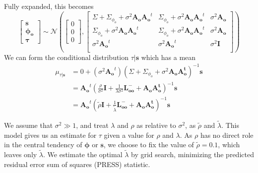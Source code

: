         \noindent Fully expanded, this becomes
        \begin{equation}
            \begin{bmatrix}
                \mathbf{s}\\
                \mathbf{\phi_o}\\
                \mathbf{\tau}
            \end{bmatrix} \sim \mathcal{N}\left(
                \begin{bmatrix}0\\0\\0\end{bmatrix},
                \begin{bmatrix}
                    \Sigma + \Sigma_{\phi_o} + \sigma^2\mathbf{A_oA_o}^t &
                    \Sigma_{\phi_o} + \sigma^2\mathbf{A_oA_o}^t &
                    \sigma^2\mathbf{A_o}\\
                    \Sigma_{\phi_o} + \sigma^2\mathbf{A_oA_o}^t &
                    \Sigma_{\phi_o} + \sigma^2\mathbf{A_oA_o}^t &
                    \sigma^2\mathbf{A_o}\\
                    \sigma^2\mathbf{A_o}^t & \sigma^2\mathbf{A_o}^t & \sigma^2\mathbf{I}\\
                \end{bmatrix}
            \right)\label{eqn:multivariate_gaussian_model}
        \end{equation}
        We can form the conditional distribution $\tau|\mathbf{s}$ which has a mean
        \begin{align}
            \mu_{\tau|\mathbf{s}} &= 0 + (\sigma^2\mathbf{A_o}^t)\left(
                \Sigma + \Sigma_{\phi_o} + \sigma^2\mathbf{A_oA_o^t}\right)^{-1}\mathbf{s}\\
            &= \mathbf{A_o}^t\left(
                \frac{\rho}{\sigma^2}\mathbf{I} + \frac{1}{\lambda\sigma^2}\mathbf{L_{oo}^-} + 
                \mathbf{A_oA_o^t}
                \right)^{-1}\mathbf{s} \nonumber\\
            &= \mathbf{A_o}^t\left(
                {\tilde\rho}\mathbf{I} + \frac{1}{{\tilde\lambda}}\mathbf{L_{oo}^-} + 
                \mathbf{A_oA_o^t}
                \right)^{-1}\mathbf{s} \label{eqn:tau_given_s}
        \end{align}

        We assume that $\sigma^2 \gg 1$, and treat $\lambda$ and $\rho$
        as relative to $\sigma^2$, as ${\tilde \rho}$ and ${\tilde \lambda}$.
        This model gives us an estimate for $\tau$ given a value for
        $\rho$ and $\lambda$. As $\rho$ has no direct role in the central
        tendency of $\mathbf{\phi}$ or $\mathbf{s}$, we choose to fix the
        value of ${\tilde \rho} = 0.1$, which leaves only ${\tilde \lambda}$.
        We estimate the optimal ${\tilde \lambda}$ by grid search, minimizing
        the predicted residual error sum of squares (PRESS) statistic.

